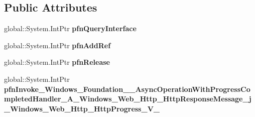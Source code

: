 \subsection*{Public Attributes}
\begin{DoxyCompactItemize}
\item 
\mbox{\label{struct_windows_1_1_foundation_1_1_async_operation_with_progress_completed_handler___a___windows_aed865ee38f1f3fe63b6da8d83d4b4f2_af89fb27a278d916ba17b43be95bb6e2d}} 
global\+::\+System.\+Int\+Ptr {\bfseries pfn\+Query\+Interface}
\item 
\mbox{\label{struct_windows_1_1_foundation_1_1_async_operation_with_progress_completed_handler___a___windows_aed865ee38f1f3fe63b6da8d83d4b4f2_ad471d25d6412aab8ee0aeb676342c3a0}} 
global\+::\+System.\+Int\+Ptr {\bfseries pfn\+Add\+Ref}
\item 
\mbox{\label{struct_windows_1_1_foundation_1_1_async_operation_with_progress_completed_handler___a___windows_aed865ee38f1f3fe63b6da8d83d4b4f2_a6614d4667c180a601381fcde4f96f751}} 
global\+::\+System.\+Int\+Ptr {\bfseries pfn\+Release}
\item 
\mbox{\label{struct_windows_1_1_foundation_1_1_async_operation_with_progress_completed_handler___a___windows_aed865ee38f1f3fe63b6da8d83d4b4f2_a057bab2323993ea53bcb22b858d31266}} 
global\+::\+System.\+Int\+Ptr {\bfseries pfn\+Invoke\+\_\+\+Windows\+\_\+\+Foundation\+\_\+\+\_\+\+Async\+Operation\+With\+Progress\+Completed\+Handler\+\_\+\+A\+\_\+\+Windows\+\_\+\+Web\+\_\+\+Http\+\_\+\+Http\+Response\+Message\+\_\+j\+\_\+\+Windows\+\_\+\+Web\+\_\+\+Http\+\_\+\+Http\+Progress\+\_\+\+V\+\_\+}
\end{DoxyCompactItemize}
